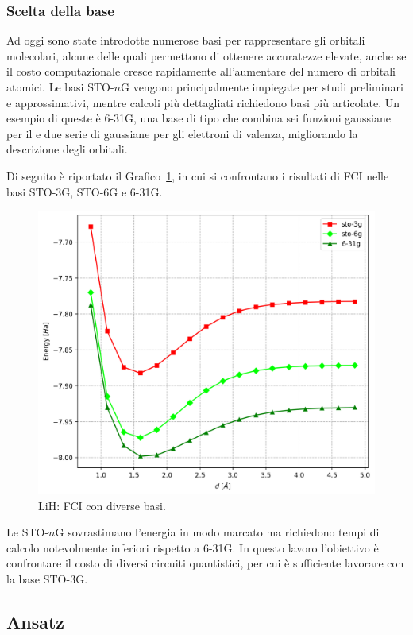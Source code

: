 \subsubsection{Scelta della base}

Ad oggi sono state introdotte numerose basi per rappresentare gli orbitali molecolari, alcune delle quali permettono di ottenere accuratezze elevate, anche se il costo computazionale cresce rapidamente all’aumentare del numero di orbitali atomici. Le basi STO-$n$G vengono principalmente impiegate per studi preliminari e approssimativi, mentre calcoli più dettagliati richiedono basi più articolate. Un esempio di queste è 6-31G, una base di tipo  che combina sei funzioni gaussiane per il  e due serie di gaussiane per gli elettroni di valenza, migliorando la descrizione degli orbitali.

Di seguito è riportato il Grafico~\ref{fig:FCI-e-basi}, in cui si confrontano i risultati di FCI nelle basi STO-3G, STO-6G e 6-31G. 

\begin{figure}[H]
    \centering
    \hspace{-1cm}
    \includegraphics[width=.6\linewidth]{Immagini/Capitolo_3/FCI_e_basi.png}
    \caption{LiH: FCI con diverse basi.}
    \label{fig:FCI-e-basi}
\end{figure}

Le STO-$n$G sovrastimano l’energia in modo marcato ma richiedono tempi di calcolo notevolmente inferiori rispetto a 6-31G. In questo lavoro l’obiettivo è confrontare il costo di diversi circuiti quantistici, per cui è sufficiente lavorare con la base STO-3G.

\newpage

\subsection{Ansatz}

